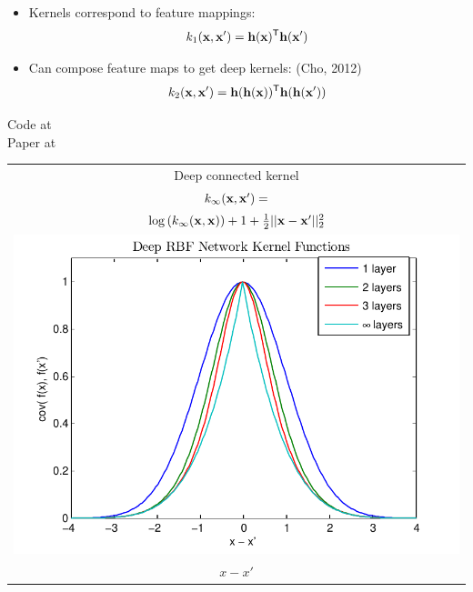 \documentclass[portrait,a0b,final,a4resizeable]{include/a0poster}
\newcommand{\feat}{\vh}
\begin{document}
\begin{poster}
\begin{multicols}{2}
\begin{minipage}[c]{0.6\columnwidth}
\begin{itemize}
\item Kernels correspond to feature mappings:
$${k_1(\vx, \vx') = \feat(\vx) \tra \feat(\vx')}$$
\item Can compose feature maps to get deep kernels: {\color{mydarkblue} (Cho, 2012) }
$${k_2(\vx, \vx') = \feat(\feat(\vx)) \tra \feat(\feat(\vx'))}$$

\end{itemize}

Code at {}\\
Paper at {}

\end{minipage}
\begin{minipage}[c]{0.39\columnwidth}
\begin{centering}
\begin{tabular}{c}
Deep connected kernel \\
$k_\infty(\mathbf{x}, \mathbf{x}') = $ \\ $\log \left(k_\infty(\mathbf{x}, \mathbf{x}) \right) + 1 + \frac{1}{2} || \mathbf{x} - \mathbf{x}' ||_2^2$ \\[0.5cm]
\hspace{-0.5cm}\includegraphics[width=\columnwidth, clip, trim = 0cm 0.4cm 0.9cm 0.3cm]{../figures/deep_kernel_connected} \\
$x - x'$
\end{tabular}
\end{centering}
\end{minipage}

\end{multicols}
\end{poster}
\end{document}

